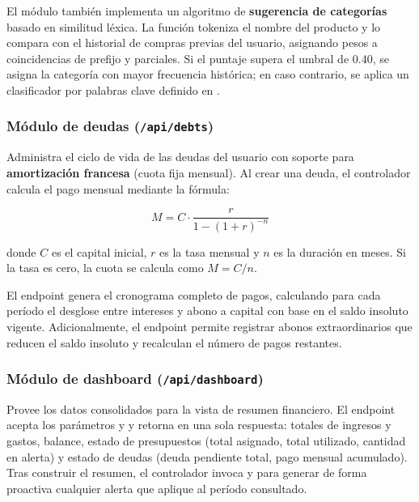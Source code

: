 El módulo también implementa un algoritmo de \textbf{sugerencia de
categorías} basado en similitud léxica. La función
 tokeniza el nombre del producto y
lo compara con el historial de compras previas del usuario,
asignando pesos a coincidencias de prefijo y parciales. Si el
puntaje supera el umbral de 0.40, se asigna la categoría con
mayor frecuencia histórica; en caso contrario, se aplica un
clasificador por palabras clave definido en
.

\subsubsection{Módulo de deudas (\texttt{/api/debts})}

Administra el ciclo de vida de las deudas del usuario con soporte
para \textbf{amortización francesa} (cuota fija mensual). Al crear
una deuda, el controlador calcula el pago mensual mediante la fórmula:

\begin{equation}
  M = C \cdot \frac{r}{1 - (1 + r)^{-n}}
  \label{eq:amort-francesa}
\end{equation}

donde $C$ es el capital inicial, $r$ es la tasa mensual y $n$ es la
duración en meses. Si la tasa es cero, la cuota se calcula como
$M = C / n$.

El endpoint  genera el cronograma
completo de pagos, calculando para cada período el desglose entre
intereses y abono a capital con base en el saldo insoluto vigente.
Adicionalmente, el endpoint 
permite registrar abonos extraordinarios que reducen el saldo insoluto
y recalculan el número de pagos restantes.

\subsubsection{Módulo de dashboard (\texttt{/api/dashboard})}

Provee los datos consolidados para la vista de resumen financiero. El
endpoint  acepta los parámetros 
y  y retorna en una sola respuesta: totales de ingresos
y gastos, balance, estado de presupuestos (total asignado, total
utilizado, cantidad en alerta) y estado de deudas (deuda pendiente
total, pago mensual acumulado). Tras construir el resumen, el
controlador invoca  y
 para generar de forma proactiva cualquier
alerta que aplique al período consultado.

